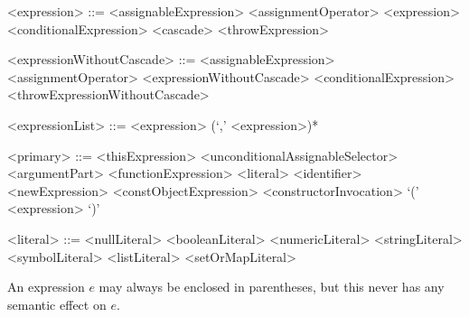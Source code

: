 \documentclass[makeidx]{article}
\begin{document}
{%

\begin{grammar}
<expression> ::= <assignableExpression> <assignmentOperator> <expression>
  \alt <conditionalExpression>
  \alt <cascade>
  \alt <throwExpression>

<expressionWithoutCascade> ::= \gnewline{}
  <assignableExpression> <assignmentOperator> <expressionWithoutCascade>
  \alt <conditionalExpression>
  \alt <throwExpressionWithoutCascade>

<expressionList> ::= <expression> (`,' <expression>)*

<primary> ::= <thisExpression>
  \alt \SUPER{} <unconditionalAssignableSelector>
  \alt \SUPER{} <argumentPart>
  \alt <functionExpression>
  \alt <literal>
  \alt <identifier>
  \alt <newExpression>
  \alt <constObjectExpression>
  \alt <constructorInvocation>
  \alt `(' <expression> `)'

<literal> ::= <nullLiteral>
  \alt <booleanLiteral>
  \alt <numericLiteral>
  \alt <stringLiteral>
  \alt <symbolLiteral>
  \alt <listLiteral>
  \alt <setOrMapLiteral>
\end{grammar}

\LMHash{}%
An expression $e$ may always be enclosed in parentheses,
but this never has any semantic effect on $e$.



}
\end{document}
